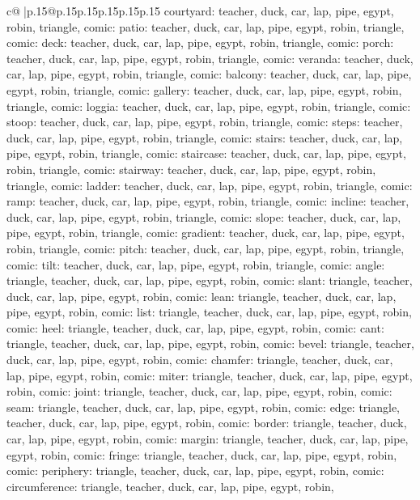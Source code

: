 \documentclass{article}
\begin{document}
{\begin{supertabular}{c@{$\;$}|p{.15\linewidth}@{}p{.15\linewidth}p{.15\linewidth}p{.15\linewidth}p{.15\linewidth}p{.15\linewidth}}
{{{courtyard\nTARGETS: teacher, duck, car, lap, pipe, egypt, robin, triangle, comic\n\nCLUE: patio\nTARGETS: teacher, duck, car, lap, pipe, egypt, robin, triangle, comic\n\nCLUE: deck\nTARGETS: teacher, duck, car, lap, pipe, egypt, robin, triangle, comic\n\nCLUE: porch\nTARGETS: teacher, duck, car, lap, pipe, egypt, robin, triangle, comic\n\nCLUE: veranda\nTARGETS: teacher, duck, car, lap, pipe, egypt, robin, triangle, comic\n\nCLUE: balcony\nTARGETS: teacher, duck, car, lap, pipe, egypt, robin, triangle, comic\n\nCLUE: gallery\nTARGETS: teacher, duck, car, lap, pipe, egypt, robin, triangle, comic\n\nCLUE: loggia\nTARGETS: teacher, duck, car, lap, pipe, egypt, robin, triangle, comic\n\nCLUE: stoop\nTARGETS: teacher, duck, car, lap, pipe, egypt, robin, triangle, comic\n\nCLUE: steps\nTARGETS: teacher, duck, car, lap, pipe, egypt, robin, triangle, comic\n\nCLUE: stairs\nTARGETS: teacher, duck, car, lap, pipe, egypt, robin, triangle, comic\n\nCLUE: staircase\nTARGETS: teacher, duck, car, lap, pipe, egypt, robin, triangle, comic\n\nCLUE: stairway\nTARGETS: teacher, duck, car, lap, pipe, egypt, robin, triangle, comic\n\nCLUE: ladder\nTARGETS: teacher, duck, car, lap, pipe, egypt, robin, triangle, comic\n\nCLUE: ramp\nTARGETS: teacher, duck, car, lap, pipe, egypt, robin, triangle, comic\n\nCLUE: incline\nTARGETS: teacher, duck, car, lap, pipe, egypt, robin, triangle, comic\n\nCLUE: slope\nTARGETS: teacher, duck, car, lap, pipe, egypt, robin, triangle, comic\n\nCLUE: gradient\nTARGETS: teacher, duck, car, lap, pipe, egypt, robin, triangle, comic\n\nCLUE: pitch\nTARGETS: teacher, duck, car, lap, pipe, egypt, robin, triangle, comic\n\nCLUE: tilt\nTARGETS: teacher, duck, car, lap, pipe, egypt, robin, triangle, comic\n\nCLUE: angle\nTARGETS: triangle, teacher, duck, car, lap, pipe, egypt, robin, comic\n\nCLUE: slant\nTARGETS: triangle, teacher, duck, car, lap, pipe, egypt, robin, comic\n\nCLUE: lean\nTARGETS: triangle, teacher, duck, car, lap, pipe, egypt, robin, comic\n\nCLUE: list\nTARGETS: triangle, teacher, duck, car, lap, pipe, egypt, robin, comic\n\nCLUE: heel\nTARGETS: triangle, teacher, duck, car, lap, pipe, egypt, robin, comic\n\nCLUE: cant\nTARGETS: triangle, teacher, duck, car, lap, pipe, egypt, robin, comic\n\nCLUE: bevel\nTARGETS: triangle, teacher, duck, car, lap, pipe, egypt, robin, comic\n\nCLUE: chamfer\nTARGETS: triangle, teacher, duck, car, lap, pipe, egypt, robin, comic\n\nCLUE: miter\nTARGETS: triangle, teacher, duck, car, lap, pipe, egypt, robin, comic\n\nCLUE: joint\nTARGETS: triangle, teacher, duck, car, lap, pipe, egypt, robin, comic\n\nCLUE: seam\nTARGETS: triangle, teacher, duck, car, lap, pipe, egypt, robin, comic\n\nCLUE: edge\nTARGETS: triangle, teacher, duck, car, lap, pipe, egypt, robin, comic\n\nCLUE: border\nTARGETS: triangle, teacher, duck, car, lap, pipe, egypt, robin, comic\n\nCLUE: margin\nTARGETS: triangle, teacher, duck, car, lap, pipe, egypt, robin, comic\n\nCLUE: fringe\nTARGETS: triangle, teacher, duck, car, lap, pipe, egypt, robin, comic\n\nCLUE: periphery\nTARGETS: triangle, teacher, duck, car, lap, pipe, egypt, robin, comic\n\nCLUE: circumference\nTARGETS: triangle, teacher, duck, car, lap, pipe, egypt, robin, }}}
\end{supertabular}}
\end{document}
